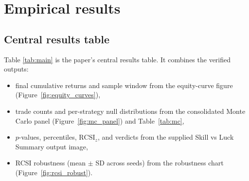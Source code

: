 \documentclass[preprint,12pt]{elsarticle}
\theoremstyle{definition}
\begin{document}
\section{Empirical results}

\subsection{Central results table}

Table \ref{tab:main} is the paper's central results table. It combines the verified outputs:
\begin{itemize}
\item final cumulative returns and sample window from the equity-curve figure (Figure~\ref{fig:equity_curves}),
\item trade counts and per-strategy null distributions from the consolidated Monte Carlo panel (Figure~\ref{fig:mc_panel}) and Table~\ref{tab:mc},
\item $p$-values, percentiles, $\mathrm{RCSI}_z$, and verdicts from the supplied Skill vs Luck Summary output image,
\item RCSI robustness (mean $\pm$ SD across seeds) from the robustness chart (Figure~\ref{fig:rcsi_robust}).
\end{itemize}
\end{document}
